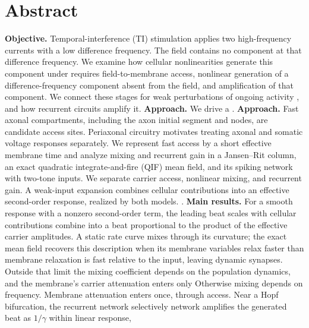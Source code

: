\documentclass[11pt,a4paper]{article}
\newif\ifjne
\providecommand{\DIFaddtex}[1]{{\protect\color{blue} \sf #1}} %
\providecommand{\DIFdeltex}[1]{{\protect\color{red} \scriptsize #1}} %
\providecommand{\DIFaddbegin}{} %
\providecommand{\DIFaddend}{} %
\providecommand{\DIFdelbegin}{} %
\providecommand{\DIFdelend}{} %
\providecommand{\DIFadd}[1]{\texorpdfstring{\DIFaddtex{#1}}{#1}} %
\providecommand{\DIFdel}[1]{\texorpdfstring{\DIFdeltex{#1}}{}} %
\begin{document}
\section*{Abstract}
\ifjne
\noindent
\textbf{Objective.} Temporal-interference (TI) stimulation \DIFdelbegin \DIFdel{applies two high-frequency
currents with a low difference frequency. The field contains no component at that difference frequency. We examine how cellular nonlinearities generate this component
under }\DIFdelend \DIFaddbegin \DIFadd{requires field-to-membrane
access, nonlinear generation of a difference-frequency component absent from the
field, and amplification of that component. We connect these stages for }\DIFaddend weak
perturbations of ongoing activity\DIFdelbegin \DIFdel{, and how recurrent circuits amplify it. \textbf{Approach.} We drive a }\DIFdelend \DIFaddbegin \DIFadd{.
\textbf{Approach.} Fast axonal compartments, including the axon initial segment and
nodes, are candidate access sites. Periaxonal circuitry motivates treating axonal
and somatic voltage responses separately. We represent fast access by a short
effective membrane time and analyze mixing and recurrent gain in a }\DIFaddend Jansen--Rit
column, an exact quadratic integrate-and-fire \DIFdelbegin \DIFdel{(QIF) }\DIFdelend mean field, and its spiking network\DIFdelbegin \DIFdel{with two-tone inputs.
We separate carrier
access, nonlinear mixing, and recurrent gain. A weak-input expansion combines cellular
contributions into an effective second-order response, realized by both models.
}\DIFdelend \DIFaddbegin \DIFadd{.
}\DIFaddend \textbf{Main results.} For a smooth response with a nonzero second-order term,
\DIFdelbegin \DIFdel{the
leading beat scales with }\DIFdelend \DIFaddbegin \DIFadd{cellular contributions combine into a beat proportional to }\DIFaddend the product of the
effective carrier amplitudes. A static rate curve mixes through its curvature;
the exact mean field recovers this description when \DIFdelbegin \DIFdel{its membrane variables relax faster
than }\DIFdelend \DIFaddbegin \DIFadd{membrane relaxation is fast
relative to }\DIFaddend the input, leaving dynamic synapses. \DIFdelbegin \DIFdel{Outside that limit the mixing coefficient
depends on
the population dynamics, and the membrane's carrier attenuation enters only }\DIFdelend \DIFaddbegin \DIFadd{Otherwise mixing depends on
frequency. Membrane attenuation enters }\DIFaddend once, through access. Near a Hopf bifurcation,
the \DIFdelbegin \DIFdel{recurrent network selectively }\DIFdelend \DIFaddbegin \DIFadd{network }\DIFaddend amplifies the generated beat as $1/\gamma$ within linear response,
\end{document}
